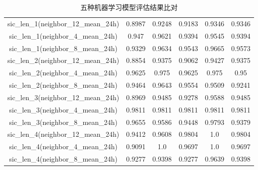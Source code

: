 \documentclass[12pt, a4paper, oneside]{ctexart}
\numberwithin{equation}{section}  %
\begin{document}
\begin{table}[H]
\begin{tabular}{cccccc}
sic\_len\_1(neighbor\_12\_mean\_24h) & 0.8987       & 0.9248       & 0.9183       & 0.9346        & 0.9346       \\
sic\_len\_1(neighbor\_4\_mean\_24h)  & 0.947        & 0.9621       & 0.9394       & 0.9545        & 0.9394       \\
sic\_len\_1(neighbor\_8\_mean\_24h)  & 0.9329       & 0.9634       & 0.9543       & 0.9665        & 0.9573       \\
sic\_len\_2(neighbor\_12\_mean\_24h) & 0.8854       & 0.9375       & 0.9062       & 0.9427        & 0.9375       \\
sic\_len\_2(neighbor\_4\_mean\_24h)  & 0.9625       & 0.975        & 0.9625       & 0.975         & 0.95         \\
sic\_len\_2(neighbor\_8\_mean\_24h)  & 0.9464       & 0.9643       & 0.9554       & 0.9509        & 0.9241       \\
sic\_len\_3(neighbor\_12\_mean\_24h) & 0.8969       & 0.9485       & 0.9278       & 0.9588        & 0.9485       \\
sic\_len\_3(neighbor\_4\_mean\_24h)  & 0.9811       & 0.9811       & 0.9811       & 0.9811        & 0.9811       \\
sic\_len\_3(neighbor\_8\_mean\_24h)  & 0.9655       & 0.9586       & 0.9448       & 0.9793        & 0.9379       \\
sic\_len\_4(neighbor\_12\_mean\_24h) & 0.9412       & 0.9608       & 0.9804       & 1.0           & 0.9804       \\
sic\_len\_4(neighbor\_4\_mean\_24h)  & 0.9091       & 1.0          & 0.9697       & 1.0           & 0.9697       \\
sic\_len\_4(neighbor\_8\_mean\_24h)  & 0.9277       & 0.9398       & 0.9277       & 0.9639        & 0.9398      \\
    \bottomrule
\end{tabular}
    \caption{五种机器学习模型评估结果比对}
    \label{table-ML-compare}
\end{table}
\end{document}
